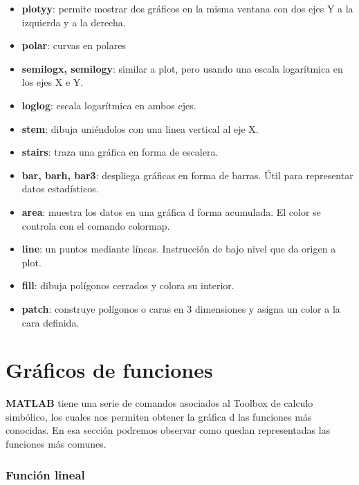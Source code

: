 \begin{itemize}
\item \textbf{plotyy}: permite mostrar dos gráficos en la misma ventana con dos ejes Y a la izquierda y a la derecha.
\item \textbf{polar}: curvas en polares
\item \textbf{semilogx, semilogy}: similar a plot, pero usando una escala logarítmica en los ejes X e Y.
\item \textbf{loglog}: escala logarítmica en ambos ejes.
\item \textbf{stem}: dibuja uniéndolos con una linea vertical al eje X.
\item \textbf{stairs}: traza una gráfica en forma de escalera.
\item \textbf{bar, barh, bar3}: despliega gráficas en forma de barras. Útil para representar datos estadísticos.
\item \textbf{area}: muestra los datos en una gráfica d forma acumulada. El color se controla con el comando colormap. 
\item \textbf{line}: un puntos mediante líneas. Instrucción de bajo nivel que da origen a plot.
\item \textbf{fill}: dibuja polígonos cerrados y colora su interior.
\item \textbf{patch}: construye polígonos o caras en 3 dimensiones y asigna un color a la cara definida.
\end{itemize}

\section{Gráficos de funciones}

\textbf{MATLAB} tiene una serie de comandos asociados al Toolbox de calculo simbólico, los cuales nos permiten obtener la gráfica  d las funciones más conocidas. En esa sección podremos observar como quedan representadas las funciones más comunes.

\subsubsection{Función lineal}

